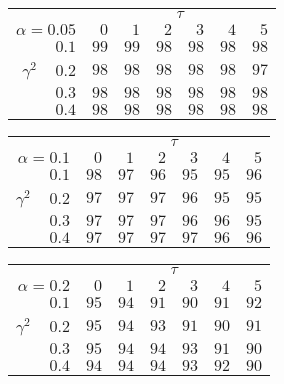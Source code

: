 \begin{tabular}{r|rrrrrr}
\hline\hline
 &\multicolumn{6}{c}{$\tau$} \\ 
 $\alpha = 0.05$ & $0$ & $1$ & $2$ & $3$ & $4$ & $5$ \\ 
 \hline$0.1$ & $99$ & $99$ & $98$ & $98$ & $98$ & $98$\\ 
$\gamma^2\;\;\;$ $0.2$ & $98$ & $98$ & $98$ & $98$ & $98$ & $97$\\ 
$0.3$ & $98$ & $98$ & $98$ & $98$ & $98$ & $98$\\ 
$0.4$ & $98$ & $98$ & $98$ & $98$ & $98$ & $98$\\ 
 \hline 
 \end{tabular}
 
 \vspace{2em} 
 
\begin{tabular}{r|rrrrrr}
\hline\hline
 &\multicolumn{6}{c}{$\tau$} \\ 
 $\alpha = 0.1$ & $0$ & $1$ & $2$ & $3$ & $4$ & $5$ \\ 
 \hline$0.1$ & $98$ & $97$ & $96$ & $95$ & $95$ & $96$\\ 
$\gamma^2\;\;\;$ $0.2$ & $97$ & $97$ & $97$ & $96$ & $95$ & $95$\\ 
$0.3$ & $97$ & $97$ & $97$ & $96$ & $96$ & $95$\\ 
$0.4$ & $97$ & $97$ & $97$ & $97$ & $96$ & $96$\\ 
 \hline 
 \end{tabular}
 
 \vspace{2em} 
 
\begin{tabular}{r|rrrrrr}
\hline\hline
 &\multicolumn{6}{c}{$\tau$} \\ 
 $\alpha = 0.2$ & $0$ & $1$ & $2$ & $3$ & $4$ & $5$ \\ 
 \hline$0.1$ & $95$ & $94$ & $91$ & $90$ & $91$ & $92$\\ 
$\gamma^2\;\;\;$ $0.2$ & $95$ & $94$ & $93$ & $91$ & $90$ & $91$\\ 
$0.3$ & $95$ & $94$ & $94$ & $93$ & $91$ & $90$\\ 
$0.4$ & $94$ & $94$ & $94$ & $93$ & $92$ & $90$\\ 
 \hline 
 \end{tabular}